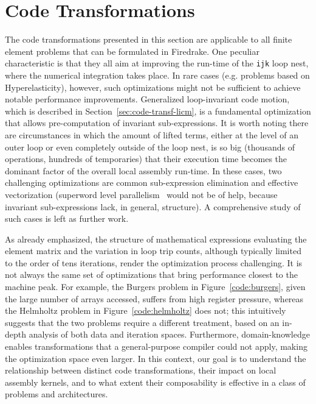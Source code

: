 \documentclass[conference]{IEEEtran}
\begin{document}
\section{Code Transformations}
\label{sec:code-transf}
The code transformations presented in this section are applicable to all finite element problems that can be formulated in Firedrake. One peculiar characteristic is that they all aim at improving the run-time of the \texttt{ijk} loop nest, where the numerical integration takes place. In rare cases (e.g. problems based on Hyperelasticity), however, such optimizations might not be sufficient to achieve notable performance improvements. Generalized loop-invariant code motion, which is described in Section~\ref{sec:code-transf-licm}, is a fundamental optimization that allows pre-computation of invariant sub-expressions. It is worth noting there are circumstances in which the amount of lifted terms, either at the level of an outer loop or even completely outside of the loop nest, is so big (thousands of operations, hundreds of temporaries) that their execution time becomes the dominant factor of the overall local assembly run-time. In these cases, two challenging optimizations are common sub-expression elimination and effective vectorization (superword level parallelism~\cite{SLP} would not be of help, because invariant sub-expressions lack, in general, structure). A comprehensive study of such cases is left as further work.

As already emphasized, the structure of mathematical expressions evaluating the element matrix and the variation in loop trip counts, although typically limited to the order of tens iterations, render the optimization process challenging. It is not always the same set of optimizations that bring performance closest to the machine peak. For example, the Burgers problem in Figure~\ref{code:burgers}, given the large number of arrays accessed, suffers from high register pressure, whereas the Helmholtz problem in Figure~\ref{code:helmholtz} does not; this intuitively suggests that the two problems require a different treatment, based on an in-depth analysis of both data and iteration spaces. Furthermore, domain-knowledge enables transformations that a general-purpose compiler could not apply, making the optimization space even larger. In this context, our goal is to understand the relationship between distinct code transformations, their impact on local assembly kernels, and to what extent their composability is effective in a class of problems and architectures.
\end{document}
